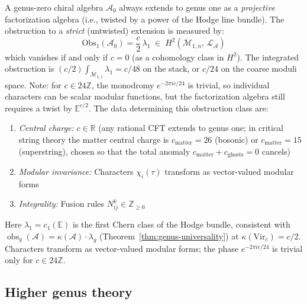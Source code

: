 \begin{theorem}\label{thm:extension-obstruction}
A genus-zero chiral algebra $\mathcal{A}_0$ always extends to genus one as a \emph{projective} factorization algebra (i.e., twisted by a power of the Hodge line bundle).  The obstruction to a \emph{strict} (untwisted) extension is measured by:
\[\mathrm{Obs}_1(\mathcal{A}_0) = \frac{c}{2}\,\lambda_1 \;\in\; H^2(\overline{\mathcal{M}}_{1,n},\, \mathcal{L}_{\mathcal{A}})\]
which vanishes if and only if $c = 0$ (as a cohomology class in $H^2$).  The integrated obstruction is $(c/2)\int_{\overline{\mathcal{M}}_{1,1}}\lambda_1 = c/48$ on the stack, or $c/24$ on the coarse moduli space.  Note: for $c \in 24\mathbb{Z}$, the monodromy $e^{-2\pi i c/24}$ is trivial, so individual characters can be scalar modular functions, but the factorization algebra still requires a twist by $\mathbb{E}^{c/2}$.  The data determining this obstruction class are:
\begin{enumerate}
\item \emph{Central charge:} $c \in \mathbb{R}$ (any rational CFT extends to genus one; in critical string theory the matter central charge is $c_{\mathrm{matter}} = 26$ (bosonic) or $c_{\mathrm{matter}} = 15$ (superstring), chosen so that the total anomaly $c_{\mathrm{matter}} + c_{\mathrm{ghosts}} = 0$ cancels)
\item \emph{Modular invariance:} Characters $\chi_i(\tau)$ transform as vector-valued modular forms
\item \emph{Integrality:} Fusion rules $N_{ij}^k \in \mathbb{Z}_{\geq 0}$
\end{enumerate}

Here $\lambda_1 = c_1(\mathbb{E})$ is the first Chern class of the Hodge bundle, consistent with $\operatorname{obs}_g(\mathcal{A}) = \kappa(\mathcal{A})\cdot\lambda_g$ (Theorem~\ref{thm:genus-universality}) at $\kappa(\mathrm{Vir}_c) = c/2$.  Characters transform as vector-valued modular forms; the phase $e^{-2\pi i c/24}$ is trivial only for $c \in 24\mathbb{Z}$.
\end{theorem}


\subsection{Higher genus theory}\label{subsec:higher-genus}

